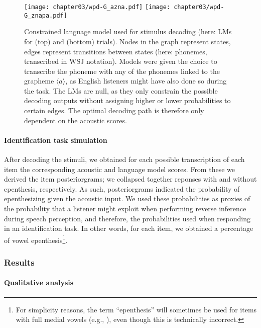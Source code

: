 {\begin{figure*}[htb]
\centering
\texttt{[image: chapter03/wpd-G\_azna.pdf]}
\vspace{0.5cm}
\texttt{[image: chapter03/wpd-G\_znapa.pdf]}
\caption{Constrained language model used for stimulus decoding (here: LMs for  (top) and  (bottom) trials). Nodes in the graph represent states, edges represent transitions between states (here: phonemes, transcribed in WSJ notation). Models were given the choice to transcribe the phoneme  with any of the phonemes linked to the grapheme $\langle a \rangle$, as English listeners might have also done so during the task. The LMs are null, as they only constrain the possible decoding outputs without assigning higher or lower probabilities to certain edges. The optimal decoding path is therefore only dependent on the acoustic scores.}
\label{fig:wpd_G}
\end{figure*}

\paragraph{Identification task simulation}
After decoding the stimuli, we obtained for each possible transcription of each item the corresponding acoustic and language model scores. From these we derived the item posteriorgrams; we collapsed together reponses with and without epenthesis, respectively. As such, posteriorgrams indicated the probability of epenthesizing \textipa{[@]} given the acoustic input. We used these probabilities as proxies of the probability that a listener might exploit when performing reverse inference during speech perception, and therefore, the probabilities used when responding in an identification task. In other words, for each item, we obtained a percentage of vowel epenthesis\footnote{For simplicity reasons, the term ``epenthesis'' will sometimes be used for items with full medial vowels (e.g., ), even though this is technically incorrect.}.

\subsubsection{Results}
  
\paragraph{Qualitative analysis}

}
